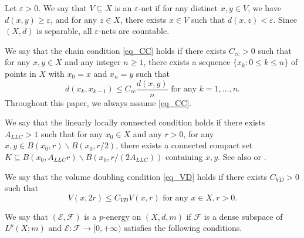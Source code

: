 \documentclass[11pt,a4paper]{article}
\numberwithin{equation}{section}
\theoremstyle{plain}
\theoremstyle{definition}
\begin{document}
Let $\varepsilon>0$. We say that $V\subseteq X$ is an $\varepsilon$-net if for any distinct $x,y\in V$, we have $d(x,y)\ge\varepsilon$, and for any $z\in X$, there exists $x\in V$ such that $d(x,z)<\varepsilon$. Since $(X,d)$ is separable, all $\varepsilon$-nets are countable.

We say that the chain condition \ref{eq_CC} holds if there exists $C_{cc}>0$ such that for any $x,y\in X$ and any integer $n\ge1$, there exists a sequence $\{x_k:0\le k\le n\}$ of points in $X$ with $x_0=x$ and $x_n=y$ such that
\begin{equation*}\label{eq_CC}\tag*{CC}
d(x_k,x_{k-1})\le C_{cc} \frac{d(x,y)}{n}\text{ for any }k=1,\ldots,n.
\end{equation*}
Throughout this paper, we always assume \ref{eq_CC}.

We say that the linearly locally connected condition \hypertarget{eq_LLC}{} holds if there exists $A_{LLC}>1$ such that for any $x_0\in X$ and any $r>0$, for any $x,y\in B(x_0,r)\backslash B(x_0,r/2)$, there exists a connected compact set $K\subseteq B(x_0,A_{LLC}r)\backslash B(x_0,r/(2A_{LLC}))$ containing $x,y$. See also \cite[3.12]{HK98} or \cite[Page 234]{HKST15}.

We say that the volume doubling condition \ref{eq_VD} holds if there exists $C_{VD}>0$ such that
\begin{equation*}\label{eq_VD}\tag*{VD}
V(x,2r)\le C_{VD}V(x,r)\text{ for any }x\in X,r>0.
\end{equation*}

We say that $(\mathcal{E},\mathcal{F})$ is a $p$-energy on $(X,d,m)$ if $\mathcal{F}$ is a dense subspace of $L^p(X;m)$ and $\mathcal{E}:\mathcal{F}\to[0,+\infty)$ satisfies the following conditions.
\end{document}

